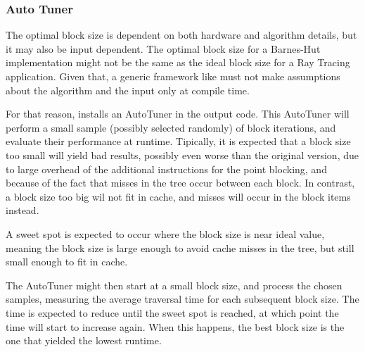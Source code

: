 \subsubsection{Auto Tuner}
\label{sec:optim:tuner}
The optimal block size is dependent on both hardware and algorithm details, but it may also be input dependent. The optimal block size for a Barnes-Hut implementation might not be the same as the ideal block size for a Ray Tracing application. Given that, a generic framework like \treetiler must not make assumptions about the algorithm and the input only at compile time.

For that reason, \treetiler installs an AutoTuner in the output code. This AutoTuner will perform a small sample (possibly selected randomly) of block iterations, and evaluate their performance at runtime.
Tipically, it is expected that a block size too small will yield bad results, possibly even worse than the original version, due to large overhead of the additional instructions for the point blocking, and because of the fact that misses in the tree occur between each block. In contrast, a block size too big wil not fit in cache, and misses will occur in the block items instead.

A sweet spot is expected to occur where the block size is near ideal value, meaning the block size is large enough to avoid cache misses in the tree, but still small enough to fit in cache.

The AutoTuner might then start at a small block size, and process the chosen samples, measuring the average traversal time for each subsequent block size. The time is expected to reduce until the sweet spot is reached, at which point the time will start to increase again.
When this happens, the best block size is the one that yielded the lowest runtime.